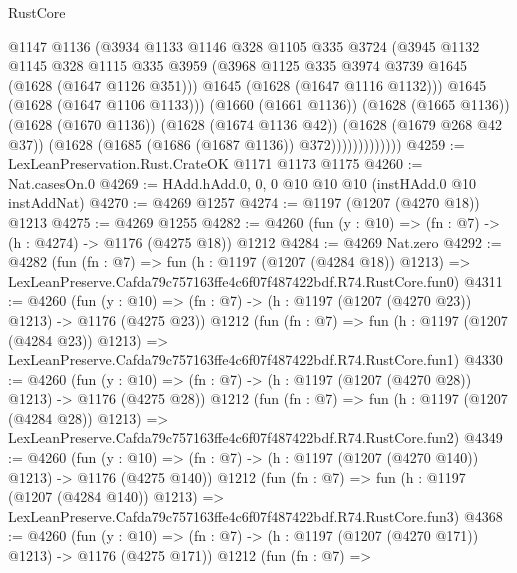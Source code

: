 \begin{lexlean}{RustCore}
\begin{coremodule}
                          @1147
                          @1136
                          (@3934
                            @1133
                            @1146
                            @328
                            @1105
                            @335
                            @3724
                            (@3945
                              @1132
                              @1145
                              @328
                              @1115
                              @335
                              @3959
                              (@3968 @1125 @335 @3974 @3739 @1645 (@1628 (@1647 @1126 @351)))
                              @1645
                              (@1628 (@1647 @1116 @1132)))
                            @1645
                            (@1628 (@1647 @1106 @1133)))
                          (@1660 (@1661 @1136))
                          (@1628 (@1665 @1136))
                          (@1628 (@1670 @1136))
                          (@1628 (@1674 @1136 @42))
                          (@1628 (@1679 @268 @42 @37))
                          (@1628 (@1685 (@1686 (@1687 @1136)) @372)))))))))))))
@4259 := LexLeanPreservation.Rust.CrateOK @1171 @1173 @1175
@4260 := Nat.casesOn.{0}
@4269 := HAdd.hAdd.{0, 0, 0} @10 @10 @10 (instHAdd.{0} @10 instAddNat)
@4270 := @4269 @1257
@4274 := @1197 (@1207 (@4270 @18)) @1213
@4275 := @4269 @1255
@4282 := @4260 (fun (y : @10) => (fn : @7) -> (h : @4274) -> @1176 (@4275 @18)) @1212
@4284 := @4269 Nat.zero
@4292 := @4282
    (fun (fn : @7) =>
    fun (h : @1197 (@1207 (@4284 @18)) @1213) =>
    LexLeanPreserve.Cafda79c757163ffe4c6f07f487422bdf.R74.RustCore.fun0)
@4311 := @4260
    (fun (y : @10) => (fn : @7) -> (h : @1197 (@1207 (@4270 @23)) @1213) -> @1176 (@4275 @23))
    @1212
    (fun (fn : @7) =>
    fun (h : @1197 (@1207 (@4284 @23)) @1213) =>
    LexLeanPreserve.Cafda79c757163ffe4c6f07f487422bdf.R74.RustCore.fun1)
@4330 := @4260
    (fun (y : @10) => (fn : @7) -> (h : @1197 (@1207 (@4270 @28)) @1213) -> @1176 (@4275 @28))
    @1212
    (fun (fn : @7) =>
    fun (h : @1197 (@1207 (@4284 @28)) @1213) =>
    LexLeanPreserve.Cafda79c757163ffe4c6f07f487422bdf.R74.RustCore.fun2)
@4349 := @4260
    (fun (y : @10) => (fn : @7) -> (h : @1197 (@1207 (@4270 @140)) @1213) -> @1176 (@4275 @140))
    @1212
    (fun (fn : @7) =>
    fun (h : @1197 (@1207 (@4284 @140)) @1213) =>
    LexLeanPreserve.Cafda79c757163ffe4c6f07f487422bdf.R74.RustCore.fun3)
@4368 := @4260
    (fun (y : @10) => (fn : @7) -> (h : @1197 (@1207 (@4270 @171)) @1213) -> @1176 (@4275 @171))
    @1212
    (fun (fn : @7) =>

\end{coremodule}
\end{lexlean}
